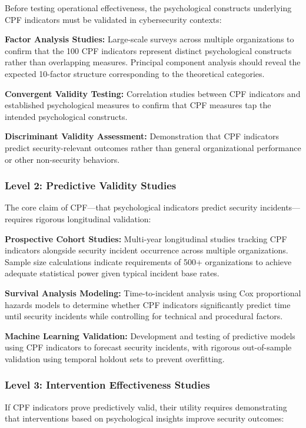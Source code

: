 \documentclass[11pt,a4paper]{article}
\begin{document}
Before testing operational effectiveness, the psychological constructs underlying CPF indicators must be validated in cybersecurity contexts:

\textbf{Factor Analysis Studies:} Large-scale surveys across multiple organizations to confirm that the 100 CPF indicators represent distinct psychological constructs rather than overlapping measures. Principal component analysis should reveal the expected 10-factor structure corresponding to the theoretical categories.

\textbf{Convergent Validity Testing:} Correlation studies between CPF indicators and established psychological measures to confirm that CPF measures tap the intended psychological constructs.

\textbf{Discriminant Validity Assessment:} Demonstration that CPF indicators predict security-relevant outcomes rather than general organizational performance or other non-security behaviors.

\subsubsection{Level 2: Predictive Validity Studies}

The core claim of CPF—that psychological indicators predict security incidents—requires rigorous longitudinal validation:

\textbf{Prospective Cohort Studies:} Multi-year longitudinal studies tracking CPF indicators alongside security incident occurrence across multiple organizations. Sample size calculations indicate requirements of 500+ organizations to achieve adequate statistical power given typical incident base rates.

\textbf{Survival Analysis Modeling:} Time-to-incident analysis using Cox proportional hazards models to determine whether CPF indicators significantly predict time until security incidents while controlling for technical and procedural factors.

\textbf{Machine Learning Validation:} Development and testing of predictive models using CPF indicators to forecast security incidents, with rigorous out-of-sample validation using temporal holdout sets to prevent overfitting.

\subsubsection{Level 3: Intervention Effectiveness Studies}

If CPF indicators prove predictively valid, their utility requires demonstrating that interventions based on psychological insights improve security outcomes:
\end{document}
